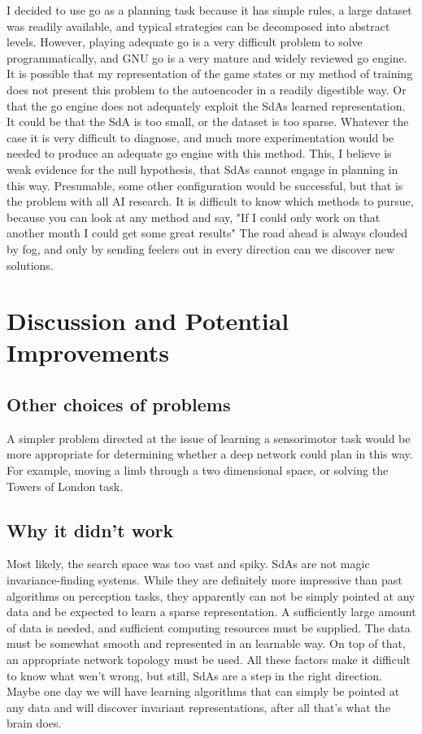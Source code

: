 \documentclass[12pt]{article}
\begin{document}
I decided to use go as a planning task because it has simple rules, a large dataset was readily available, and typical strategies can be decomposed into abstract levels. However, playing adequate go is a very difficult problem to solve programmatically, and GNU go is a very mature and widely reviewed go engine. It is possible that my representation of the game states or my method of training does not present this problem to the autoencoder in a readily digestible way. Or that the go engine does not adequately exploit the SdAs learned representation. It could be that the SdA is too small, or the dataset is too sparse. Whatever the case it is very difficult to diagnose, and much more experimentation would be needed to produce an adequate go engine with this method. This, I believe is weak evidence for the null hypothesis, that SdAs cannot engage in planning in this way. Presumable, some other configuration would be successful, but that is the problem with all AI research. It is difficult to know which methods to pursue, because you can look at any method and say, "If I could only work on that another month I could get some great results" The road ahead is always clouded by fog, and only by sending feelers out in every direction can we discover new solutions.
	
\section{Discussion and Potential Improvements}
	\subsection{Other choices of problems}
	
A simpler problem directed at the issue of learning a sensorimotor task would be more appropriate for determining whether a deep network could plan in this way. For example, moving a limb through a two dimensional space, or solving the Towers of London task.
	
	\subsection{Why it didn't work}
	
Most likely, the search space was too vast and spiky. SdAs are not magic invariance-finding systems. While they are definitely more impressive than past algorithms on perception tasks, they apparently can not be simply pointed at any data and be expected to learn a sparse representation. A sufficiently large amount of data is needed, and sufficient computing resources must be supplied. The data must be somewhat smooth and represented in an learnable way. On top of that, an appropriate network topology must be used. All these factors make it difficult to know what wen't wrong, but still, SdAs are a step in the right direction. Maybe one day we will have learning algorithms that can simply be pointed at any data and will discover invariant representations, after all that's what the brain does.
	
\end{document}
